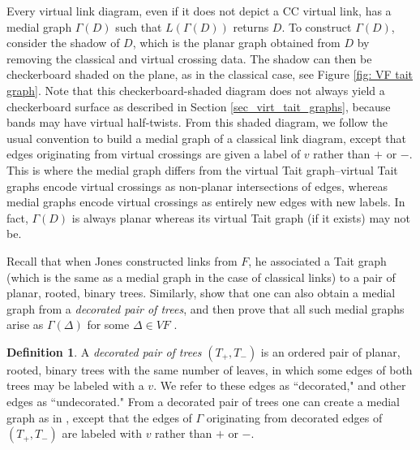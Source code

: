 \documentclass[11pt, twoside]{amsart}
\numberwithin{equation}{section}
\theoremstyle{definition}
\newtheorem{definition}[theorem]{Definition}
\numberwithin{equation}{section}
\begin{document}
Every virtual link diagram, even if it does not depict a CC virtual link, has a medial graph $\Gamma(D)$ such that $L(\Gamma(D))$ returns $D$. To construct $\Gamma(D)$, consider the shadow of $D$, which is the planar graph obtained from $D$ by removing the classical and virtual crossing data. The shadow can then be checkerboard shaded on the plane, as in the classical case, see Figure \ref{fig: VF tait graph}. Note that this checkerboard-shaded diagram does not always yield a checkerboard surface as described in Section \ref{sec_virt_tait_graphs}, because bands may have virtual half-twists. From this shaded diagram, we follow the usual convention to build a medial graph of a classical link diagram, except that edges originating from virtual crossings are given a label of $v$ rather than $+$ or $-$. This is where the medial graph differs from the virtual Tait graph--virtual Tait graphs encode virtual crossings as non-planar intersections of edges, whereas medial graphs encode virtual crossings as entirely new edges with new labels. In fact, $\Gamma(D)$ is always planar whereas its virtual Tait graph (if it exists) may not be.



Recall that when Jones constructed links from $F$, he associated a Tait graph (which is the same as a medial graph in the case of classical links) to a pair of planar, rooted, binary trees. Similarly, \cite{KTVF} show that one can also obtain a medial graph from a \textit{decorated pair of trees}, and then prove that all such medial graphs arise as $\Gamma(\Delta)$ for some $\Delta \in \mathit{VF}$ \cite[Lemmas 3.2 and 4.2]{KTVF}.

\begin{definition}
    A \textit{decorated pair of trees} $(T_+,T_-)$ is an ordered pair of planar, rooted, binary trees with the same number of leaves, in which some edges of both trees may be labeled with a $v$. We refer to these edges as ``decorated," and other edges as ``undecorated." From a decorated pair of trees one can create a medial graph as in \cite[Definition 4.1.2]{jones_unitary}, except that the edges of $\Gamma$ originating from decorated edges of $(T_+,T_-)$ are labeled with $v$ rather than $+$ or $-$.
\end{definition}
\end{document}

